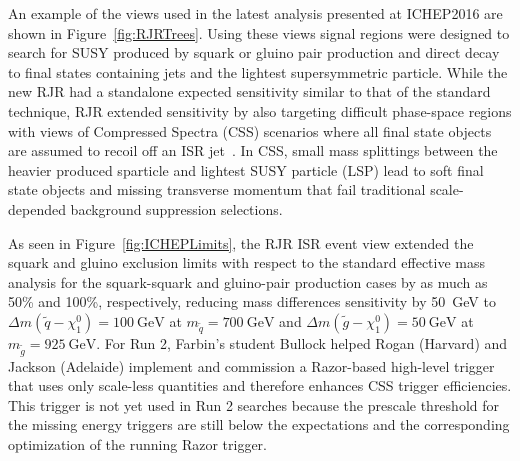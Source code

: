 An example of the views used in the latest analysis presented at
ICHEP2016 are shown in Figure~\ref{fig:RJRTrees}.  Using these views
signal regions were designed to search for SUSY produced by squark or
gluino pair production and direct decay to final states containing
jets and the lightest supersymmetric particle. While the new RJR had a
standalone expected sensitivity similar to that of the standard
technique, RJR extended sensitivity by also targeting difficult
phase-space regions with views of Compressed Spectra (CSS) scenarios
where all final state objects are assumed to recoil off an ISR
jet~\cite{Jackson:2016mfb}. In CSS, small mass splittings between the
heavier produced sparticle and lightest SUSY particle (LSP) lead to
soft final state objects and missing transverse momentum that fail
traditional scale-depended background suppression selections. 

As seen in Figure~\ref{fig:ICHEPLimits}, the RJR ISR event view
extended the squark and gluino exclusion limits with respect to the
standard effective mass analysis for the squark-squark and gluino-pair
production cases by as much as 50\% and 100\%, respectively, reducing
mass differences sensitivity by 50~GeV to $\Delta m(\tilde{q} -
\chi_1^0) = 100~\mathrm{GeV}$ at $m_{\tilde{q}} = 700~\mathrm{GeV}$  and 
$\Delta m(\tilde{g} -\chi_1^0) = 50~\mathrm{GeV}$ at $m_{\tilde{g}} =
925~\mathrm{GeV}$. For Run 2, Farbin's student Bullock helped Rogan
(Harvard) and Jackson (Adelaide) implement and commission a
Razor-based high-level trigger that uses only scale-less quantities
and therefore enhances CSS trigger efficiencies. This trigger is not
yet used in Run 2 searches because the prescale threshold for the
missing energy triggers are still below the expectations and the
corresponding optimization of the running Razor trigger.

